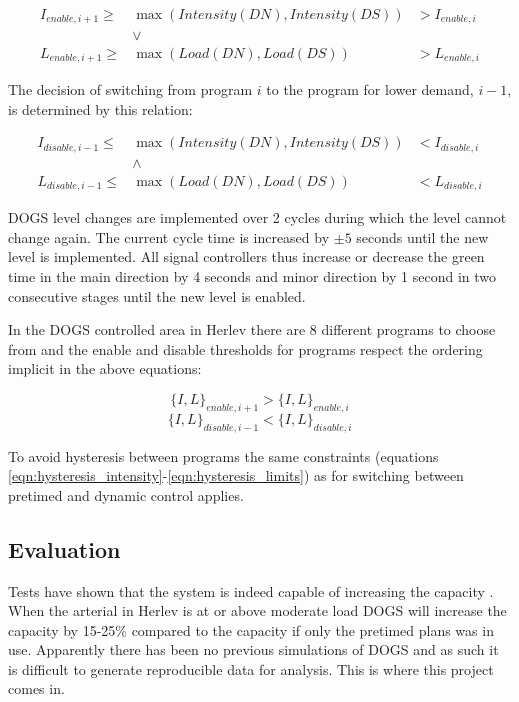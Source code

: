\begin{eqnarray*}
I_{enable,i+1} \geq & \max(Intensity(DN),Intensity(DS)) & > I_{enable,i} \\
& \vee & \\
L_{enable,i+1} \geq & \max(Load(DN),Load(DS))  & > L_{enable,i}
\end{eqnarray*}

The decision of switching from program $i$ to the program for lower demand, $i-1$, is determined by this relation:

\begin{eqnarray*}
I_{disable,i-1} \leq & \max(Intensity(DN),Intensity(DS)) & < I_{disable,i} \\
& \wedge & \\
L_{disable,i-1} \leq & \max(Load(DN),Load(DS))  & < L_{disable,i}
\end{eqnarray*}

DOGS level changes are implemented over 2 cycles during which the level cannot change again. The current cycle time is increased by $\pm 5$ seconds until the new level is implemented. All signal controllers thus increase or decrease the green time in the main direction by 4 seconds and minor direction by 1 second in two consecutive stages until the new level is enabled.

In the DOGS controlled area in Herlev there are 8 different programs to choose from and the enable and disable thresholds for programs respect the ordering implicit in the above equations:

$$\lbrace I,L \rbrace_{enable,i+1} > \lbrace I,L \rbrace_{enable,i}$$
$$\lbrace I,L \rbrace_{disable,i-1} < \lbrace I,L \rbrace_{disable,i}$$

To avoid hysteresis between programs the same constraints (equations \ref{eqn:hysteresis_intensity}-\ref{eqn:hysteresis_limits}) as for switching between pretimed and dynamic control applies.

\subsection{Evaluation}
Tests have shown that the system is indeed capable of increasing the capacity \cite{dogs}. When the arterial in Herlev is at or above moderate load DOGS will increase the capacity by 15-25\% compared to the capacity if only the pretimed plans was in use. Apparently there has been no previous simulations of DOGS and as such it is difficult to generate reproducible data for analysis. This is where this project comes in.

